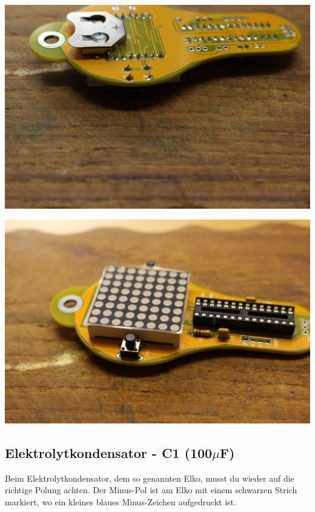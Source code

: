 \documentclass{article}
\begin{document}
\begin{minipage}[b]{0.5\textwidth}
	\includegraphics[width=\textwidth]{Bilder/IMG_5590.JPG}
\end{minipage}
\begin{minipage}[b]{0.5\textwidth}
	\includegraphics[width=\textwidth]{Bilder/IMG_5592.JPG}
\end{minipage}

\subsection{Elektrolytkondensator - C1 (100$\mu$F)}

Beim Elektrolytkondensator, dem so genannten Elko, musst du wieder auf die richtige Polung achten. Der Minus-Pol ist am Elko mit einem schwarzen Strich markiert, wo ein kleines blaues Minus-Zeichen aufgedruckt ist.
\end{document}
